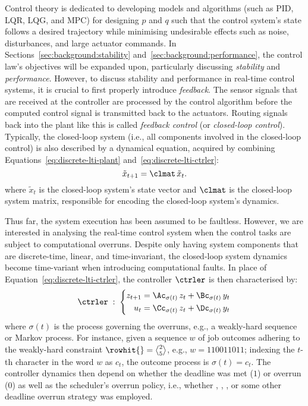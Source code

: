 Control theory is dedicated to developing models and algorithms (such as PID, LQR, LQG, and MPC) for designing $p$ and $q$ such that the control system's state follows a desired trajectory while minimising undesirable effects such as noise, disturbances, and large actuator commands.
In Sections~\ref{sec:background:stability} and~\ref{sec:background:performance}, the control law's objectives will be expanded upon, particularly discussing \emph{stability}  and \emph{performance}.
However, to discuss stability and performance in real-time control systems, it is crucial to first properly introduce \emph{feedback}.
The sensor signals that are received at the controller are processed by the control algorithm before the computed control signal is transmitted back to the actuators.
Routing signals back into the plant like this is called \emph{feedback control} (or \emph{closed-loop control}).
Typically, the closed-loop system (i.e., all components involved in the closed-loop control) is also described by a dynamical equation, acquired by combining Equations~\eqref{eq:discrete-lti-plant} and~\eqref{eq:discrete-lti-ctrler}:
%
\begin{equation}%
    \label{eq:clsys}%
    \tilde{x}_{t+1} = \clmat\, \tilde{x}_t.
\end{equation}
%
where $\tilde{x}_t$ is the closed-loop system's state vector and $\clmat$ is the closed-loop system matrix, responsible for encoding the closed-loop system's dynamics.

Thus far, the system execution has been assumed to be faultless.
However, we are interested in analysing the real-time control system when the control tasks are subject to computational overruns.
Despite only having system components that are discrete-time, linear, and time-invariant, the closed-loop system dynamics become time-variant when introducing computational faults.
In place of Equation~\eqref{eq:discrete-lti-ctrler}, the controller $\ctrler$ is then characterised by:
%
\begin{equation}%
    \label{eq:tv-ctrler}%
    \ctrler \; : \; \left\{\begin{aligned}
        z_{t+1} &= \Ac_{\sigma(t)}\,z_t + \Bc_{\sigma(t)}\,y_t \\
        u_t &= \Cc_{\sigma(t)}\,z_t + \Dc_{\sigma(t)}\,y_t \\
    \end{aligned}\right.
\end{equation}
%
where $\sigma(t)$ is the process governing the overruns, e.g., a weakly-hard sequence or Markov process.
For instance, given a sequence $w$ of job outcomes adhering to the weakly-hard constraint $\rowhit{} = \genfrac{<}{>}{0pt}{}{2}{5}$, e.g., $w = 110011011$; indexing the $t$-th character in the word $w$ as $c_t$, the outcome process is $\sigma(t) = c_t$.
The controller dynamics then depend on whether the deadline was met ($1$) or overrun ($0$) as well as the scheduler's overrun policy, i.e., whether \tK{}, \tS{}, \tQ{}, or some other deadline overrun strategy was employed.

